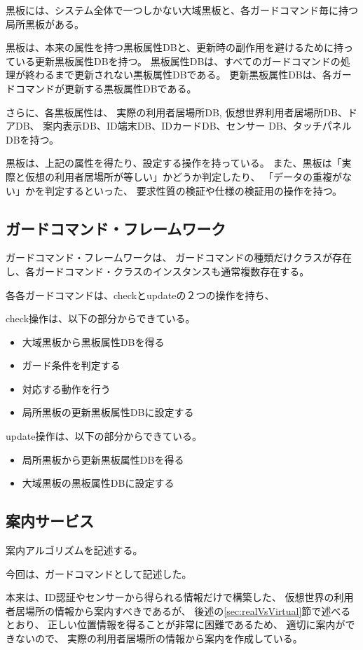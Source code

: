 \documentclass[a4paper,8pt]{jsarticle}
\begin{document}
黒板には、システム全体で一つしかない大域黒板と、各ガードコマンド毎に持つ局所黒板がある。

黒板は、本来の属性を持つ黒板属性DBと、更新時の副作用を避けるために持っている更新黒板属性DBを持つ。
黒板属性DBは、すべてのガードコマンドの処理が終わるまで更新されない黒板属性DBである。
更新黒板属性DBは、各ガードコマンドが更新する黒板属性DBである。

さらに、各黒板属性は、
実際の利用者居場所DB, 仮想世界利用者居場所DB、ドアDB、
案内表示DB、ID端末DB、IDカードDB、センサー DB、タッチパネルDBを持つ。

黒板は、上記の属性を得たり、設定する操作を持っている。
また、黒板は「実際と仮想の利用者居場所が等しい」かどうか判定したり、
「データの重複がない」かを判定するといった、
要求性質の検証や仕様の検証用の操作を持つ。

\subsection{ガードコマンド・フレームワーク}
ガードコマンド・フレームワークは、
ガードコマンドの種類だけクラスが存在し、各ガードコマンド・クラスのインスタンスも通常複数存在する。

各各ガードコマンドは、checkとupdateの２つの操作を持ち、

check操作は、以下の部分からできている。

\begin{itemize}
	\item 大域黒板から黒板属性DBを得る
	\item ガード条件を判定する
	\item 対応する動作を行う
	\item 局所黒板の更新黒板属性DBに設定する
\end{itemize}

update操作は、以下の部分からできている。

\begin{itemize}
	\item 局所黒板から更新黒板属性DBを得る
	\item 大域黒板の黒板属性DBに設定する
\end{itemize}

\subsection{案内サービス}
案内アルゴリズムを記述する。

今回は、ガードコマンドとして記述した。

本来は、ID認証やセンサーから得られる情報だけで構築した、
仮想世界の利用者居場所の情報から案内すべきであるが、
後述の\ref{sec:realVsVirtual}節で述べるとおり、
正しい位置情報を得ることが非常に困難であるため、
適切に案内ができないので、
実際の利用者居場所の情報から案内を作成している。
\end{document}
